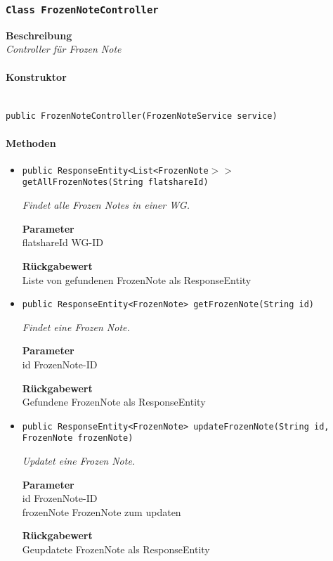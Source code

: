     \subsubsection{\texttt{Class FrozenNoteController}}
    \textbf{Beschreibung} \\
    \textit{Controller für Frozen Note}
    \paragraph*{Konstruktor}\mbox{} \\
    \texttt{public FrozenNoteController(FrozenNoteService service)} \\
    \paragraph*{Methoden}
    \begin{itemize}
    	\item{\texttt{public ResponseEntity<List<FrozenNote$>>$ getAllFrozenNotes(String flatshareId)}}
    	
    	\textit{Findet alle Frozen Notes in einer WG.}
    	
    	\textbf{Parameter} \\
    	flatshareId WG-ID
    	
    	\textbf{Rückgabewert} \\
    	Liste von gefundenen FrozenNote als ResponseEntity        \item{\texttt{public ResponseEntity<FrozenNote> getFrozenNote(String id)}}
    	
    	\textit{Findet eine Frozen Note.}
    	
    	\textbf{Parameter} \\
    	id FrozenNote-ID
    	
    	\textbf{Rückgabewert} \\
    	Gefundene FrozenNote als ResponseEntity        \item{\texttt{public ResponseEntity<FrozenNote> updateFrozenNote(String id, FrozenNote frozenNote)}}
    	
    	\textit{Updatet eine Frozen Note.}
    	
    	\textbf{Parameter} \\
    	id FrozenNote-ID\\
    	frozenNote FrozenNote zum updaten
    	
    	\textbf{Rückgabewert} \\
    	Geupdatete FrozenNote als ResponseEntity
    \end{itemize}
